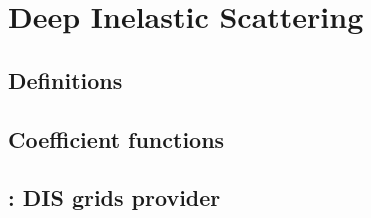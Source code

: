 
\chapter{Deep Inelastic Scattering}
\label{ch:dis}
\minitoc
\adjustmtc



\section{Definitions}
\label{sec:dis/defs}


\section{Coefficient functions}
\label{sec:dis/coeffs}


\section{\yadism: DIS grids provider}
\label{sec:dis/yadism}

